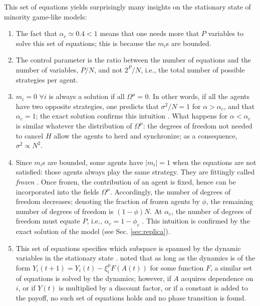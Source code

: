 \documentclass[aps,twocolumn,nofootinbib,sortedaddress,reprint]{revtex4-1}
\begin{document}
This set of equations yields surprisingly many insights on the
stationary state of minority game-like models:

\begin{enumerate}
\item The fact that $\alpha_c\simeq 0.4 < 1$ means that one needs more that $P$ variables to
  solve this set of equations; this is because the $m_i$s are bounded.
\item The control parameter is the ratio between the number of equations and the number
of variables, $P/N$, and not $2^P/N$, i.e., the total
  number of possible strategies per agent.
\item $m_i=0$ $\forall i$ is always a solution if all
  $\Omega^\mu=0$. In other words, if all the agents have two opposite
  strategies, one predicts that $\sigma^2/N=1$ for $\alpha>\alpha_c$,
  and that $\alpha_c=1$; the exact solution confirms this intuition
  \cite{MMM}. What happens for $\alpha<\alpha_c$ is similar whatever
  the distribution of $\Omega^\mu$: the degrees of freedom not needed
  to cancel $H$ allow the agents to herd and synchronize; as a
  consequence, $\sigma^2\propto N^2$.
\item Since $m_i$s are bounded, some agents have $|m_i|=1$ when the
  equations are not satisfied: those agents always play the same
  strategy. They are fittingly called \emph{frozen} \cite{CM99}. Once
  frozen, the contribution of an agent is fixed, hence can be
  incorporated into the fields $\Omega^\mu$. Accordingly, the number
  of degrees of freedom decreases; denoting the fraction of frozen
  agents by $\phi$, the remaining number of degrees of freedom is
  $(1-\phi)N$. At $\alpha_c$, the number of degrees of freedom  must equate $P$,
  i.e., $\alpha_c=1-\phi_c$ \cite{MCZe00,MC01}. This intuition is confirmed by the exact
  solution of the model (see Sec. \ref{sec:replica}).
\item This set of equations specifies which subspace is spanned by the
  dynamic variables in the stationary state
  \cite{MC01}. \textcite{GallaClubbing} noted that as long as the
  dynamics is of the form $Y_i(t+1)=Y_i(t)-\xi_i^\mu F(A(t))$ for some
  function $F$, a similar set of equations is solved by the dynamics;
  however, if $A$ acquires dependence on $i$, or if $Y(t)$ is multiplied by a discount factor, or if a
  constant is added to the payoff, no such set of equations holds and
  no phase transition is found.
\end{enumerate}
\end{document}
